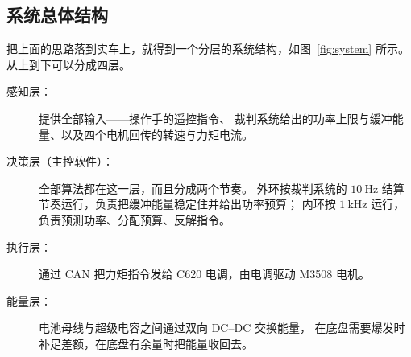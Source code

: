 \documentclass[cn,blue,11pt,device=normal]{elegantnote}
\begin{document}
\subsection{系统总体结构}\label{sec:system}

把上面的思路落到实车上，就得到一个分层的系统结构，如图~\ref{fig:system} 所示。
从上到下可以分成四层。

\begin{description}
  \item[感知层：] 提供全部输入——操作手的遥控指令、
  裁判系统给出的功率上限与缓冲能量、以及四个电机回传的转速与力矩电流。
  \item[决策层（主控软件）：] 全部算法都在这一层，而且分成两个节奏。
  外环按裁判系统的 $10\ \mathrm{Hz}$ 结算节奏运行，负责把缓冲能量稳定住并给出功率预算；
  内环按 $1\ \mathrm{kHz}$ 运行，负责预测功率、分配预算、反解指令。
  \item[执行层：] 通过 CAN 把力矩指令发给 C620 电调，由电调驱动 M3508 电机。
  \item[能量层：] 电池母线与超级电容之间通过双向 DC--DC 交换能量，
  在底盘需要爆发时补足差额，在底盘有余量时把能量收回去。
\end{description}
\end{document}

